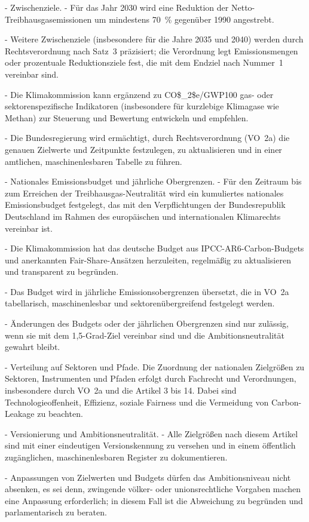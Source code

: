 \documentclass[12pt,a4paper]{scrartcl}
\begin{document}
- Zwischenziele.
- Für das Jahr 2030 wird eine Reduktion der Netto-Treibhausgasemissionen um mindestens 70 \% gegenüber 1990 angestrebt.

- Weitere Zwischenziele (insbesondere für die Jahre 2035 und 2040) werden durch Rechtsverordnung nach Satz 3 präzisiert; die Verordnung legt Emissionsmengen oder prozentuale Reduktionsziele fest, die mit dem Endziel nach Nummer 1 vereinbar sind.

- Die Klimakommission kann ergänzend zu CO\$\_2\$e/GWP100 gas- oder sektorenspezifische Indikatoren (insbesondere für kurzlebige Klimagase wie Methan) zur Steuerung und Bewertung entwickeln und empfehlen.

- Die Bundesregierung wird ermächtigt, durch Rechtsverordnung (VO 2a) die genauen Zielwerte und Zeitpunkte festzulegen, zu aktualisieren und in einer amtlichen, maschinenlesbaren Tabelle zu führen.

- Nationales Emissionsbudget und jährliche Obergrenzen.
- Für den Zeitraum bis zum Erreichen der Treibhausgas-Neutralität wird ein kumuliertes nationales Emissionsbudget festgelegt, das mit den Verpflichtungen der Bundesrepublik Deutschland im Rahmen des europäischen und internationalen Klimarechts vereinbar ist.

- Die Klimakommission hat das deutsche Budget aus IPCC-AR6-Carbon-Budgets und anerkannten Fair-Share-Ansätzen herzuleiten, regelmäßig zu aktualisieren und transparent zu begründen.

- Das Budget wird in jährliche Emissionsobergrenzen übersetzt, die in VO 2a tabellarisch, maschinenlesbar und sektorenübergreifend festgelegt werden.

- Änderungen des Budgets oder der jährlichen Obergrenzen sind nur zulässig, wenn sie mit dem 1,5-Grad-Ziel vereinbar sind und die Ambitionsneutralität gewahrt bleibt.

- Verteilung auf Sektoren und Pfade. Die Zuordnung der nationalen Zielgrößen zu Sektoren, Instrumenten und Pfaden erfolgt durch Fachrecht und Verordnungen, insbesondere durch VO 2a und die Artikel 3 bis 14. Dabei sind Technologieoffenheit, Effizienz, soziale Fairness und die Vermeidung von Carbon-Leakage zu beachten.

- Versionierung und Ambitionsneutralität.
- Alle Zielgrößen nach diesem Artikel sind mit einer eindeutigen Versionskennung zu versehen und in einem öffentlich zugänglichen, maschinenlesbaren Register zu dokumentieren.

- Anpassungen von Zielwerten und Budgets dürfen das Ambitionsniveau nicht absenken, es sei denn, zwingende völker- oder unionsrechtliche Vorgaben machen eine Anpassung erforderlich; in diesem Fall ist die Abweichung zu begründen und parlamentarisch zu beraten.
\end{document}
